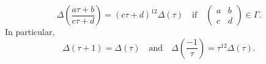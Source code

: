 $$\Delta\left(\frac{a\tau + b}{c\tau + d}\right) = (c\tau + d)^{12}\Delta(\tau) \quad \text{if} \quad \begin{pmatrix} a & b \\ c & d \end{pmatrix} \in \Gamma.$$
In particular,
$$\Delta(\tau + 1) = \Delta(\tau) \quad \text{and} \quad \Delta\left(\frac{-1}{\tau}\right) = \tau^{12}\Delta(\tau).$$